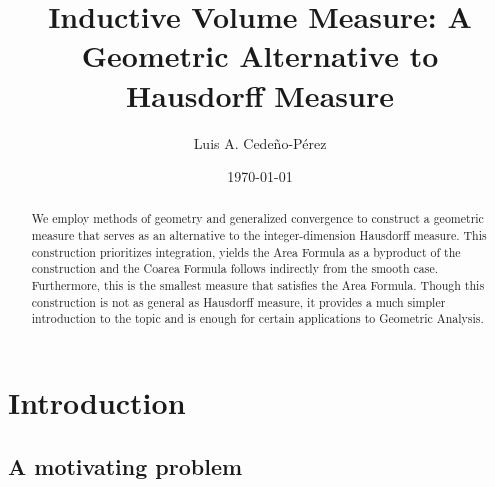\documentclass[%
 aip,
 amsmath,amssymb,
 reprint,%
jmp]{revtex4-2}
\begin{document}

\title[Inductive Volume Measure: A Geometric Alternative to Hausdorff Measure]{Inductive Volume Measure: A Geometric Alternative to Hausdorff Measure}
\author{{Luis A.} {Cede\~no-P\'erez}}



\date{\today}

\begin{abstract}
We employ methods of geometry and generalized convergence to construct a geometric measure that serves as an alternative to the integer-dimension Hausdorff measure. This construction prioritizes integration, yields the Area Formula as a byproduct of the construction and the Coarea Formula follows indirectly from the smooth case. Furthermore, this is the smallest measure that satisfies the Area Formula. Though this construction is not as general as Hausdorff measure, it provides a much simpler introduction to the topic and is enough for certain applications to Geometric Analysis.
\end{abstract}



\maketitle

\tableofcontents

\section{Introduction}

\subsection{A motivating problem}
\end{document}
